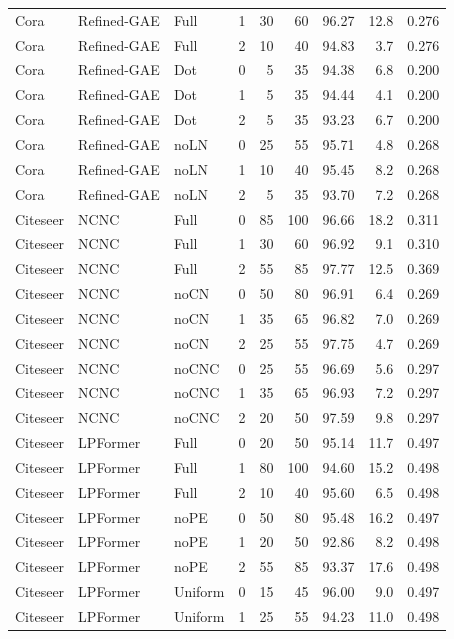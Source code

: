 {\begin{longtable}{lllrrrrrr}
Cora & Refined-GAE & Full & 1 & 30 & 60 & 96.27 & 12.8 & 0.276 \\
Cora & Refined-GAE & Full & 2 & 10 & 40 & 94.83 & 3.7 & 0.276 \\
Cora & Refined-GAE & Dot & 0 & 5 & 35 & 94.38 & 6.8 & 0.200 \\
Cora & Refined-GAE & Dot & 1 & 5 & 35 & 94.44 & 4.1 & 0.200 \\
Cora & Refined-GAE & Dot & 2 & 5 & 35 & 93.23 & 6.7 & 0.200 \\
Cora & Refined-GAE & noLN & 0 & 25 & 55 & 95.71 & 4.8 & 0.268 \\
Cora & Refined-GAE & noLN & 1 & 10 & 40 & 95.45 & 8.2 & 0.268 \\
Cora & Refined-GAE & noLN & 2 & 5 & 35 & 93.70 & 7.2 & 0.268 \\
Citeseer & NCNC & Full & 0 & 85 & 100 & 96.66 & 18.2 & 0.311 \\
Citeseer & NCNC & Full & 1 & 30 & 60 & 96.92 & 9.1 & 0.310 \\
Citeseer & NCNC & Full & 2 & 55 & 85 & 97.77 & 12.5 & 0.369 \\
Citeseer & NCNC & noCN & 0 & 50 & 80 & 96.91 & 6.4 & 0.269 \\
Citeseer & NCNC & noCN & 1 & 35 & 65 & 96.82 & 7.0 & 0.269 \\
Citeseer & NCNC & noCN & 2 & 25 & 55 & 97.75 & 4.7 & 0.269 \\
Citeseer & NCNC & noCNC & 0 & 25 & 55 & 96.69 & 5.6 & 0.297 \\
Citeseer & NCNC & noCNC & 1 & 35 & 65 & 96.93 & 7.2 & 0.297 \\
Citeseer & NCNC & noCNC & 2 & 20 & 50 & 97.59 & 9.8 & 0.297 \\
Citeseer & LPFormer & Full & 0 & 20 & 50 & 95.14 & 11.7 & 0.497 \\
Citeseer & LPFormer & Full & 1 & 80 & 100 & 94.60 & 15.2 & 0.498 \\
Citeseer & LPFormer & Full & 2 & 10 & 40 & 95.60 & 6.5 & 0.498 \\
Citeseer & LPFormer & noPE & 0 & 50 & 80 & 95.48 & 16.2 & 0.497 \\
Citeseer & LPFormer & noPE & 1 & 20 & 50 & 92.86 & 8.2 & 0.498 \\
Citeseer & LPFormer & noPE & 2 & 55 & 85 & 93.37 & 17.6 & 0.498 \\
Citeseer & LPFormer & Uniform & 0 & 15 & 45 & 96.00 & 9.0 & 0.497 \\
Citeseer & LPFormer & Uniform & 1 & 25 & 55 & 94.23 & 11.0 & 0.498 \\

\end{longtable}}

